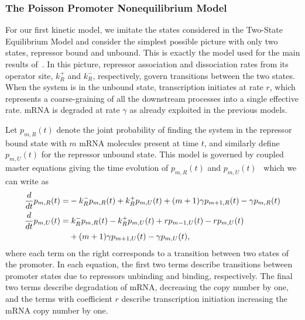 \subsubsection{The Poisson Promoter Nonequilibrium Model}
For our first kinetic model, we  imitate the states considered in
the Two-State Equilibrium Model and consider the simplest possible picture with only
two states, repressor bound and unbound. This is exactly the model used for the
main results of~\cite{Jones2014}. In this picture, repressor association and
dissociation rates from its operator site, $k_R^+$ and $k_R^-$, respectively,
govern transitions between the two states. When the system is in the unbound
state, transcription initiates at rate $r$, which represents a coarse-graining
of all the downstream processes into a single effective rate. mRNA is 
degraded at rate $\gamma$ as already exploited in the previous models.

Let $p_{m,R}(t)$ denote the joint probability of finding the system in the
repressor bound state with $m$ mRNA molecules present at time $t$, and similarly
define $p_{m,U}(t)$ for the repressor unbound state. This model is governed by coupled
master equations giving the time evolution of $p_{m,R}(t)$ and 
$p_{m,U}(t)$~\cite{Sanchez2008,Sanchez2011, Phillips2019}
which we can write as 
\begin{align}
\begin{split}
\frac{d {}}{d t}p_{m,R}(t) =& - k_R^- p_{m,R}(t) + k_R^+ p_{m,U}(t)
                + (m+1)\gamma p_{m+1,R}(t) - \gamma p_{m,R}(t)
\\
\frac{d {}}{d t}p_{m,U}(t) =&\; k_R^- p_{m,R}(t) - k_R^+ p_{m,U}(t)
                        + rp_{m-1,U}(t) - rp_{m,U}(t)
                \\
                &+ (m+1)\gamma p_{m+1,U}(t) - \gamma p_{m,U}(t),
\label{eq:poisson_promoter_cme}
\end{split}
\end{align}
where each term on the right corresponds to a transition between two
states of the promoter.
In each equation, the first two terms describe transitions between promoter
states due to repressors unbinding and binding, respectively. The final two
terms describe degradation of mRNA, decreasing the copy number by one, and the
terms with coefficient $r$ describe transcription initiation increasing the mRNA
copy number by one.

